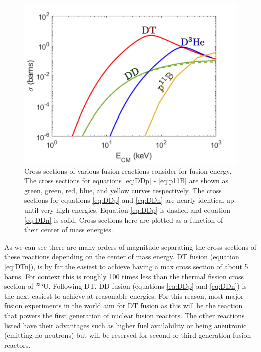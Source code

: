 \begin{figure}[h!]
	\centering
	\includegraphics[scale=0.7]{Figures/crossSections.pdf}
	\caption[Fusion Cross-Sections]{Cross sections of various fusion reactions consider for fusion energy. The cross sections for equations \ref{eq:DDp} - \ref{eq:p11B} are shown as green, green, red, blue, and yellow curves respectively. The cross sections for equations \ref{eq:DDp} and \ref{eq:DDn} are nearly identical up until very high energies. Equation \ref{eq:DDp} is dashed and equation \ref{eq:DDn} is solid. Cross sections here are plotted as a function of their center of mass energies. }
	\label{fig:crossSections}
\end{figure}

As we can see there are many orders of magnitude separating the cross-sections of these reactions depending on the center of mass energy. DT fusion (equation \ref{eq:DTn}), is by far the easiest to achieve having a max cross section of about 5 barns. For context this is roughly 100 times less than the thermal fission cross section of $^{235}$U. Following DT, DD fusion (equations \ref{eq:DDp} and \ref{eq:DDn}) is the next easiest to achieve at reasonable energies. For this reason, most major fusion experiments in the world aim for DT fusion as this will be the reaction that powers the first generation of nuclear fusion reactors. The other reactions listed have their advantages such as higher fuel availability or being aneutronic (emitting no neutrons) but will be reserved for second or third generation fusion reactors.

